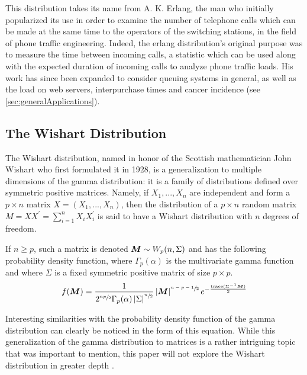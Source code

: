 \documentclass[12pt]{article}
\begin{document}
This distribution takes its name from A. K. Erlang, the man who initially popularized its use in order to examine the
number of telephone calls which can be made at the same time to the operators of the switching stations, in the field of
phone traffic engineering. Indeed, the erlang distribution's original purpose was to measure the time between incoming
calls, a statistic which can be used along with the expected duration of incoming calls to analyze phone traffic loads.
His work has since been expanded to consider queuing systems in general, as well as the load on web servers,
interpurchase times and cancer incidence (see \autoref{sec:generalApplications})\cite{zachWhatErlangDistribution2020}.


\pagebreak
\subsection{The Wishart Distribution}
The Wishart distribution, named in honor of the Scottish mathematician John Wishart who first formulated it in 1928, is
a generalization to multiple dimensions of the gamma distribution: it is a  family of distributions defined over symmetric
positive matrices. Namely, if $X_1, ..., X_n$ are independent and form a $p\times n$ matrix $X =  (X_1, ..., X_n)$, then
the distribution of a $p\times n$ random matrix $M = XX^\prime = \sum^n_{i=1}X_iX^\prime_i$ is said to have a Wishart
distribution with $n$ degrees of freedom.

If $n\geq p$, such a matrix is denoted $\bm{M}\sim W_p(n, \Sigma)$ and has the following probability density function,
where $\Gamma_p(\alpha)$ is the multivariate gamma function and where $\Sigma$ is a fixed symmetric positive matrix of
size $p \times p$.
\begin{equation}
	f(\bm{M}) = \frac{1}{2^{\sfrac{np}{2}}\Gamma_p(\alpha)\left|\Sigma\right|^{\sfrac{n}{2}}}\left|\bm{M}\right|^{\sfrac{n-p-1}{2}}e^{-\frac{\text{trace}(\Sigma^{-1}\bm{M})}{2}}
\end{equation}

Interesting similarities with the probability density function of the gamma distribution can clearly be noticed in the
form of this equation. While this generalization of the gamma distribution to matrices is a rather intriguing topic that
was important to mention, this paper will not explore the Wishart distribution in greater depth
\cite{wikipediaWishartDistribution2022}.
\end{document}
